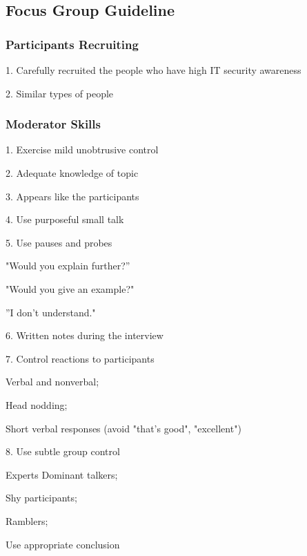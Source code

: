 \subsection{Focus Group Guideline}
\label{group_guide}


\subsubsection{Participants Recruiting}   

1. Carefully recruited the people who have high IT security awareness

2. Similar types of people  
 
\subsubsection{Moderator Skills}

1. Exercise mild unobtrusive control 

2. Adequate knowledge of topic  

3. Appears like the participants 

4. Use purposeful small talk  

5. Use pauses and probes  

\begin{addmargin}[4em]{1em}
    "Would you explain further?”
    
    "Would you give an example?"  
    
    ”I don't understand."   
\end{addmargin}

6. Written notes during the interview  

7. Control reactions to participants  

\begin{addmargin}[4em]{1em}
    Verbal and nonverbal;
    
    Head nodding; 
    
    Short verbal responses (avoid "that's good", "excellent")
\end{addmargin}

8. Use subtle group control  

\begin{addmargin}[4em]{1em}
 
    Experts Dominant talkers; 
    
    Shy participants;
    
    Ramblers; 
    
    Use appropriate conclusion  

\end{addmargin}

